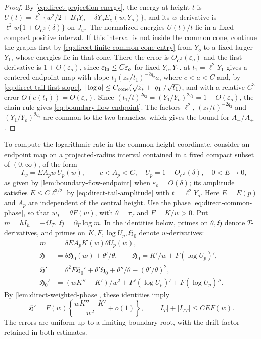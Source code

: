 \begin{proof}
By \eqref{eq:direct-projection-energy}, the energy at height \(t\) is
\(U(t)=\ell^2\{w^2/2+B_0Y_o+\delta Y_oE_\chi(w,Y_o)\}\), and its
\(w\)-derivative is \(\ell^2w\{1+O_{C^3}(\delta)\}\) on \(J_w\). The
normalized energies \(U(t)/t\) lie in a fixed compact positive
interval. If this interval is not inside the common cone, continue the
graphs first by \eqref{eq:direct-finite-common-cone-entry} from \(Y_o\)
to a fixed larger \(Y_1\), whose energies lie in that cone. There the
error is \(O_{C^k}(\varepsilon_o)\) and the first derivative is
\(1+O(\varepsilon_o)\), since \(\varepsilon_{\rm in}\le C\varepsilon_o\)
for fixed \(Y_o,Y_1\).  at
\(t_1=\ell^2Y_1\) gives a centered endpoint map with slope
\(t_1(z_*/t_1)^{-2q_2}a\), where \(c<a<C\) and, by
\eqref{eq:direct-tail-first-slope},
\(|\log a|\le C_{\rm cone}(\sqrt{z_*}+|q_1|/\sqrt{t_1})\), and with a
relative \(C^3\) error \(O(e(t_1))=O(\varepsilon_o)\). Since
\((t_1/t)^{2q_2}=(Y_1/Y_o)^{2q_2}=1+O(\varepsilon_o)\), the chain rule gives
\eqref{eq:boundary-flow-endpoint}. The factors \(\ell^2\),
\((z_*/t)^{-2q_2}\) and \((Y_1/Y_o)^{2q_2}\) are common to the two
branches, which gives the bound for \(A_-/A_+\).
\end{proof}

To compute the logarithmic rate in the common height coordinate,
consider an endpoint map on a projected-radius interval contained in a
fixed compact subset of \((0,\infty)\), of the form
\begin{equation}
\label{eq:direct-endpoint-unit}
 -I_w=EA_p w\,U_p(w),\qquad
 c<A_p<C,\quad U_p=1+O_{C^3}(\delta),\quad 0<E\longrightarrow0 ,
\end{equation}
as given by \cref{lem:boundary-flow-endpoint} when
\(\varepsilon_o=O(\delta)\); its amplitude satisfies
\(E\le C\ell^{3/2}\) by \eqref{eq:direct-tail-amplitude} with
\(t=\ell^2Y_o\). Here \(E=E(p)\) and \(A_p\) are independent of the
central height.
Use the phase \eqref{eq:direct-common-phase}, so that
\(w_T=\theta F(w)\), with \(\theta=\tau_T\) and \(F=K/w>0\).
Put \(m=hI_h=-\delta I_T\),
\(\mathfrak H=\partial_T\log m\).
In the identities below, primes on \(\theta,\mathfrak H\)
denote \(T\)-derivatives, and primes on \(K,F,\log U_p,\mathfrak H_0\) denote
\(w\)-derivatives:
\begin{align}
\label{eq:direct-rate-identities}
 m&=\delta EA_pK(w)\theta U_p(w),\\
 \mathfrak H&=\theta\mathfrak H_0(w)+\theta'/\theta,\qquad
 \mathfrak H_0=K'/w+F(\log U_p)',\nonumber\\
 \mathfrak H'&=\theta^2F\mathfrak H_0'+\theta'\mathfrak H_0
                 +\theta''/\theta-(\theta'/\theta)^2,\nonumber\\
 \mathfrak H_0'&=(wK''-K')/w^2+F'(\log U_p)'+F(\log U_p)''.\nonumber
\end{align}
By \cref{lem:direct-weighted-phase}, these identities imply
\begin{equation}
\label{eq:direct-rate-curvature}
 \mathfrak H'=F(w)\left\{\frac{wK''-K'}{w^2}+o(1)\right\},\qquad
 |I_T|+|I_{TT}|\le CEF(w).
\end{equation}
The errors are uniform up to a limiting boundary root, with the drift
factor retained in both estimates.


